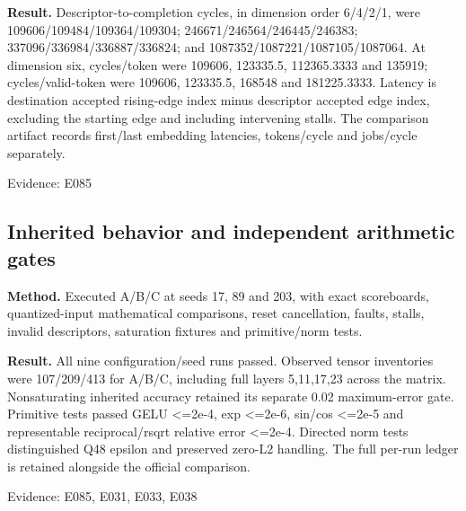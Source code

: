 \documentclass[11pt,a4paper]{article}
\begin{document}
\textbf{Result.} Descriptor-to-completion cycles,\allowbreak{} in dimension order 6/\allowbreak{}4/\allowbreak{}2/\allowbreak{}1,\allowbreak{} were 109606/\allowbreak{}109484/\allowbreak{}109364/\allowbreak{}109304; 246671/\allowbreak{}246564/\allowbreak{}246445/\allowbreak{}246383; 337096/\allowbreak{}336984/\allowbreak{}336887/\allowbreak{}336824; and 1087352/\allowbreak{}1087221/\allowbreak{}1087105/\allowbreak{}1087064. At dimension six,\allowbreak{} cycles/\allowbreak{}token were 109606,\allowbreak{} 123335.5,\allowbreak{} 112365.3333 and 135919; cycles/\allowbreak{}valid-token were 109606,\allowbreak{} 123335.5,\allowbreak{} 168548 and 181225.3333. Latency is destination accepted rising-edge index minus descriptor accepted edge index,\allowbreak{} excluding the starting edge and including intervening stalls. The comparison artifact records first/\allowbreak{}last embedding latencies,\allowbreak{} tokens/\allowbreak{}cycle and jobs/\allowbreak{}cycle separately.

{\small Evidence: E085}

\subsection{Inherited behavior and independent arithmetic gates}

\textbf{Method.} Executed A/\allowbreak{}B/\allowbreak{}C at seeds 17,\allowbreak{} 89 and 203,\allowbreak{} with exact scoreboards,\allowbreak{} quantized-input mathematical comparisons,\allowbreak{} reset cancellation,\allowbreak{} faults,\allowbreak{} stalls,\allowbreak{} invalid descriptors,\allowbreak{} saturation fixtures and primitive/\allowbreak{}norm tests.

\textbf{Result.} All nine configuration/\allowbreak{}seed runs passed. Observed tensor inventories were 107/\allowbreak{}209/\allowbreak{}413 for A/\allowbreak{}B/\allowbreak{}C,\allowbreak{} including full layers 5,\allowbreak{}11,\allowbreak{}17,\allowbreak{}23 across the matrix. Nonsaturating inherited accuracy retained its separate 0.02 maximum-error gate. Primitive tests passed GELU <=\allowbreak{}2e-4,\allowbreak{} exp <=\allowbreak{}2e-6,\allowbreak{} sin/\allowbreak{}cos <=\allowbreak{}2e-5 and representable reciprocal/\allowbreak{}rsqrt relative error <=\allowbreak{}2e-4. Directed norm tests distinguished Q48 epsilon and preserved zero-L2 handling. The full per-run ledger is retained alongside the official comparison.

{\small Evidence: E085,\allowbreak{} E031,\allowbreak{} E033,\allowbreak{} E038}
\end{document}
